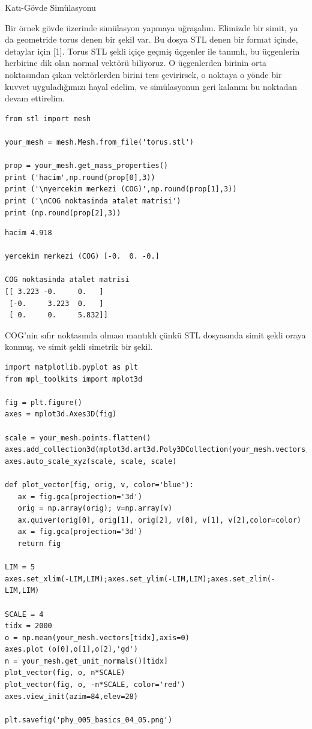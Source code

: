 \documentclass[12pt,fleqn]{article}\usepackage{../../common}
\begin{document}
Katı-Gövde Simülasyonu

Bir örnek gövde üzerinde simülasyon yapmaya uğraşalım. Elimizde bir simit, ya da
geometride torus denen bir şekil var. Bu dosya STL denen bir format içinde,
detaylar için [1]. Torus STL şekli içiçe geçmiş üçgenler ile tanımlı, bu
üçgenlerin herbirine dik olan normal vektörü biliyoruz. O üçgenlerden birinin
orta noktasından çıkan vektörlerden birini ters çevirirsek, o noktaya o yönde
bir kuvvet uyguladığımızı hayal edelim, ve simülasyonun geri kalanını bu
noktadan devam ettirelim.

\begin{verbatim}
from stl import mesh

your_mesh = mesh.Mesh.from_file('torus.stl')

prop = your_mesh.get_mass_properties()
print ('hacim',np.round(prop[0],3))
print ('\nyercekim merkezi (COG)',np.round(prop[1],3))
print ('\nCOG noktasinda atalet matrisi')
print (np.round(prop[2],3))
\end{verbatim}

\begin{verbatim}
hacim 4.918

yercekim merkezi (COG) [-0.  0. -0.]

COG noktasinda atalet matrisi
[[ 3.223 -0.     0.   ]
 [-0.     3.223  0.   ]
 [ 0.     0.     5.832]]
\end{verbatim}

COG'nin sıfır noktasında olması mantıklı çünkü STL dosyasında simit şekli oraya
konmuş, ve simit şekli simetrik bir şekil.

\begin{verbatim}
import matplotlib.pyplot as plt
from mpl_toolkits import mplot3d

fig = plt.figure()
axes = mplot3d.Axes3D(fig)

scale = your_mesh.points.flatten()
axes.add_collection3d(mplot3d.art3d.Poly3DCollection(your_mesh.vectors,alpha=0.3))
axes.auto_scale_xyz(scale, scale, scale)

def plot_vector(fig, orig, v, color='blue'):
   ax = fig.gca(projection='3d')
   orig = np.array(orig); v=np.array(v)
   ax.quiver(orig[0], orig[1], orig[2], v[0], v[1], v[2],color=color)
   ax = fig.gca(projection='3d')  
   return fig

LIM = 5
axes.set_xlim(-LIM,LIM);axes.set_ylim(-LIM,LIM);axes.set_zlim(-LIM,LIM)

SCALE = 4
tidx = 2000
o = np.mean(your_mesh.vectors[tidx],axis=0)
axes.plot (o[0],o[1],o[2],'gd')
n = your_mesh.get_unit_normals()[tidx]
plot_vector(fig, o, n*SCALE)
plot_vector(fig, o, -n*SCALE, color='red')
axes.view_init(azim=84,elev=28)

plt.savefig('phy_005_basics_04_05.png')
\end{verbatim}
\end{document}
